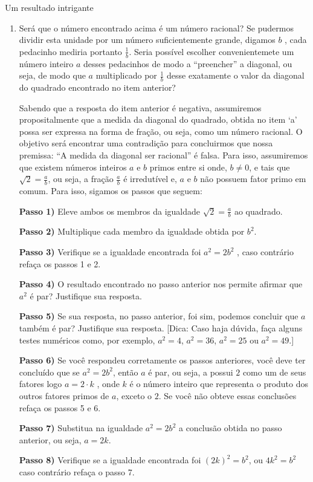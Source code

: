 \begin{task}{Um resultado intrigante}
\begin{enumerate}
\item {} 
Será que o número encontrado acima é um número racional? Se pudermos dividir esta unidade por um número suficientemente grande, digamos $b$ , cada pedacinho mediria portanto $\displaystyle\frac{1}{b}$. Seria possível escolher convenientemete um número inteiro $a$ desses pedacinhos de modo a “preencher” a diagonal, ou seja, de modo que $a$ multiplicado por $\frac{1}{b}$ desse exatamente o valor da diagonal do quadrado encontrado no item anterior?

Sabendo que a resposta do item anterior é negativa, assumiremos propositalmente que a medida da diagonal do quadrado, obtida no item ‘a’ possa ser expressa na forma de fração, ou seja, como um número racional. O objetivo será encontrar uma contradição para concluirmos que nossa premissa: “A medida da diagonal ser racional” é falsa. Para isso, assumiremos que existem números inteiros $a$ e $b$ primos entre si onde, $b \neq 0$, e tais que $\sqrt{2}=\frac{a}{b}$, ou seja, a fração $\frac{a}{b}$ é irredutível e, $a$ e $b$ não possuem fator primo em comum. Para isso, sigamos os passos que seguem:

\textbf{Passo 1)} Eleve ambos os membros da igualdade $\sqrt{2} = \frac{a}{b}$ ao quadrado.

\textbf{Passo 2)} Multiplique cada membro da igualdade obtida por $b^2$.

\textbf{Passo 3)} Verifique se a igualdade encontrada foi $a^2=2b^2$ , caso contrário refaça os passos 1 e 2.

\textbf{Passo 4)} O resultado encontrado no passo anterior nos permite afirmar que $a^2$ é par? Justifique sua resposta.

\textbf{Passo 5)} Se sua resposta, no passo anterior, foi sim, podemos concluir que $a$ também é par? Justifique sua resposta. {[}Dica: Caso haja dúvida, faça alguns testes numéricos como, por exemplo, $a^2 = 4$, $a^2 = 36$, $a^2 = 25$ ou $a^2 = 49$.{]}

\textbf{Passo 6)} Se você respondeu corretamente os passos anteriores, você deve ter concluído que se $a^2=2b^2$, então $a$ é par, ou seja, a possui $2$ como um de seus fatores logo $a = 2 \cdot k$ , onde $k$ é o número inteiro que representa o produto dos outros fatores primos de $a$, exceto o $2$. Se você não obteve essas conclusões refaça os passos 5 e 6.

\textbf{Passo 7)} Substitua na igualdade $a^2=2b^2$ a conclusão obtida no passo anterior, ou seja, $a = 2k$.

\textbf{Passo 8)} Verifique se a igualdade encontrada foi $(2k)^2=b^2$, ou $4k^2=b^2$ caso contrário refaça o passo 7.


\end{enumerate}
\end{task}
